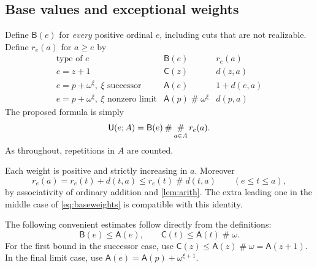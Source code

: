 \documentclass[11pt,a4paper]{article}
\theoremstyle{definition}
\newcommand{\ns}{\mathbin{\#}}
\newcommand{\bigns}{\mathop{\#}\displaylimits}
\newcommand{\FunA}{\mathsf A}
\newcommand{\FunB}{\mathsf B}
\newcommand{\FunC}{\mathsf C}
\newcommand{\FunU}{\mathsf U}
\newcommand{\dd}[2]{d(#1,#2)}
\begin{document}
\subsection{Base values and exceptional weights}
Define $\FunB(e)$ for \emph{every} positive ordinal $e$, including cuts that
are not realizable. Define $r_e(a)$ for $a\ge e$ by
\begin{equation}\label{eq:baseweights}
\begin{array}{c|c|c}
\text{type of }e&\FunB(e)&r_e(a)\\ \hline
 e=z+1 &\FunC(z)&\dd{z}{a}\\[2pt]
 e=p+\omega^\xi,\ \xi\text{ successor}
       &\FunA(e)&1+\dd{e}{a}\\[2pt]
 e=p+\omega^\xi,\ \xi\text{ nonzero limit}
       &\FunA(p)\ns\omega^\xi&\dd{p}{a}
\end{array}
\end{equation}
The proposed formula is simply
\begin{equation}\label{eq:U}
 \FunU(e;A)=\FunB(e)\ns\bigns_{a\in A}r_e(a).
\end{equation}
As throughout, repetitions in $A$ are counted.

Each weight is positive and strictly increasing in $a$. Moreover
\begin{equation}\label{eq:weight-cocycle}
 r_e(a)=r_e(t)+\dd{t}{a}\le r_e(t)\ns\dd{t}{a}
 \qquad(e\le t\le a),
\end{equation}
by associativity of ordinary addition and \cref{lem:arith}. The extra leading
one in the middle case of \eqref{eq:baseweights} is compatible with this
identity.

The following convenient estimates follow directly from the definitions:
\begin{equation}\label{eq:basebounds}
 \FunB(e)\le\FunA(e),\qquad
 \FunC(t)\le\FunA(t)\ns\omega.
\end{equation}
For the first bound in the successor case, use
$\FunC(z)\le\FunA(z)\ns\omega=\FunA(z+1)$.
In the final limit case, use
$\FunA(e)=\FunA(p)+\omega^{\xi+1}$.
\end{document}
